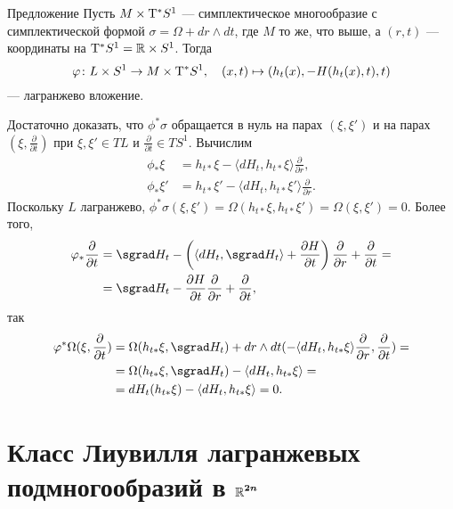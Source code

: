 \begin{thm*}{Предложение}
Пусть $M \times \mathrm{T}^\ast S^1$ --- симплектическое многообразие с
симплектической формой $\sigma = \Omega + dr \wedge dt$, где $M$ то
же, что выше, а $(r, t)$ --- координаты на $\mathrm{T}^\ast S^1 = \mathbb{R} \times S^1$.
Тогда
\[\varphi\colon L \times S^1 \to M \times \mathrm{T}^\ast S^1,
\quad
(x, t) \mapsto (h_t (x), -H (h_t (x), t), t)\]
--- лагранжево вложение.
\end{thm*}

Достаточно доказать, что $\phi^\ast \sigma$ обращается в нуль на парах $(\xi, \xi')$ и на парах  $(\xi, \tfrac{\partial}{\partial t})$ при $\xi, \xi' \in T L$ и $\tfrac{\partial}{\partial t} \in T S^1$.
Вычислим 
\begin{align*}
\phi_\ast \xi
&= h_{t\ast} \xi - \langle dH_t, h_{t\ast} \xi\rangle
\frac{\partial}{\partial r},
\\
\phi_\ast \xi'
&= h_{t\ast} \xi' - \langle dH_t, h_{t\ast} \xi'\rangle
\frac{\partial}{\partial r}.
\end{align*}
Поскольку $L$ лагранжево, $\phi^\ast \sigma (\xi, \xi') = \Omega (h_{t\ast} \xi, h_{t\ast} \xi') = \Omega (\xi, \xi') = 0$.
Более того,
\begin{align*}
\phi_\ast\frac{\partial}{\partial t}
&= \sgrad H_t - 
\left( \langle dH_t, \sgrad H_t \rangle +\frac{\partial H}{\partial t}\right) \frac{\partial}{\partial r} +\frac{\partial}{\partial t}=
\\
&=\sgrad H_t - \frac{\partial H}{\partial t}\frac{\partial}{\partial r} +\frac{\partial}{\partial t},
\end{align*}
так 
\begin{align*}
\phi^\ast \Omega (\xi, \frac{\partial}{\partial t})
&= \Omega (h_{t\ast} \xi, \sgrad H_t) + dr \wedge dt (-\langle dH_t, h_{t\ast} \xi\rangle \frac{\partial}{\partial r},\frac{\partial}{\partial t}) =
\\
&=\Omega (h_{t\ast} \xi, \sgrad H_t) - \langle dH_t, h_{t\ast} \xi\rangle =
\\
&=dH_t (h_{t\ast} \xi) - \langle dH_t, h_{t\ast} \xi\rangle = 0.
\end{align*}
\qeds

\section[Класс Лиувилля]{Класс Лиувилля лагранжевых\\подмногообразий в $\bm{\mathbb{R}^{2n}}$}

